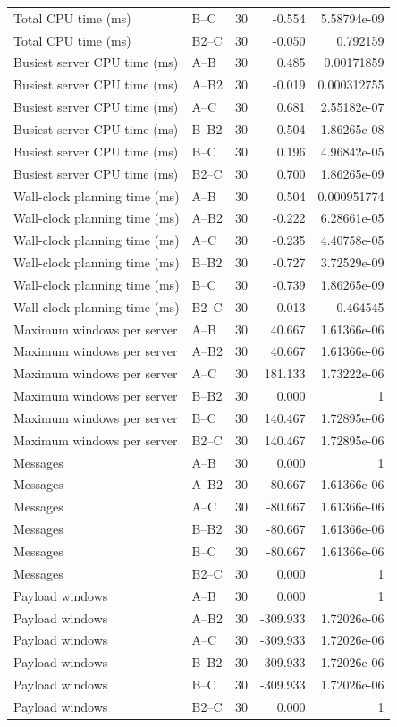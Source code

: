 \begin{table}[t]
\begin{tabular}{llrrr}
Total CPU time (ms) & B--C & 30 & -0.554 & 5.58794e-09 \\
Total CPU time (ms) & B2--C & 30 & -0.050 & 0.792159 \\
Busiest server CPU time (ms) & A--B & 30 & 0.485 & 0.00171859 \\
Busiest server CPU time (ms) & A--B2 & 30 & -0.019 & 0.000312755 \\
Busiest server CPU time (ms) & A--C & 30 & 0.681 & 2.55182e-07 \\
Busiest server CPU time (ms) & B--B2 & 30 & -0.504 & 1.86265e-08 \\
Busiest server CPU time (ms) & B--C & 30 & 0.196 & 4.96842e-05 \\
Busiest server CPU time (ms) & B2--C & 30 & 0.700 & 1.86265e-09 \\
Wall-clock planning time (ms) & A--B & 30 & 0.504 & 0.000951774 \\
Wall-clock planning time (ms) & A--B2 & 30 & -0.222 & 6.28661e-05 \\
Wall-clock planning time (ms) & A--C & 30 & -0.235 & 4.40758e-05 \\
Wall-clock planning time (ms) & B--B2 & 30 & -0.727 & 3.72529e-09 \\
Wall-clock planning time (ms) & B--C & 30 & -0.739 & 1.86265e-09 \\
Wall-clock planning time (ms) & B2--C & 30 & -0.013 & 0.464545 \\
Maximum windows per server & A--B & 30 & 40.667 & 1.61366e-06 \\
Maximum windows per server & A--B2 & 30 & 40.667 & 1.61366e-06 \\
Maximum windows per server & A--C & 30 & 181.133 & 1.73222e-06 \\
Maximum windows per server & B--B2 & 30 & 0.000 & 1 \\
Maximum windows per server & B--C & 30 & 140.467 & 1.72895e-06 \\
Maximum windows per server & B2--C & 30 & 140.467 & 1.72895e-06 \\
Messages & A--B & 30 & 0.000 & 1 \\
Messages & A--B2 & 30 & -80.667 & 1.61366e-06 \\
Messages & A--C & 30 & -80.667 & 1.61366e-06 \\
Messages & B--B2 & 30 & -80.667 & 1.61366e-06 \\
Messages & B--C & 30 & -80.667 & 1.61366e-06 \\
Messages & B2--C & 30 & 0.000 & 1 \\
Payload windows & A--B & 30 & 0.000 & 1 \\
Payload windows & A--B2 & 30 & -309.933 & 1.72026e-06 \\
Payload windows & A--C & 30 & -309.933 & 1.72026e-06 \\
Payload windows & B--B2 & 30 & -309.933 & 1.72026e-06 \\
Payload windows & B--C & 30 & -309.933 & 1.72026e-06 \\
Payload windows & B2--C & 30 & 0.000 & 1 \\
\bottomrule
\end{tabular}
\end{table}

